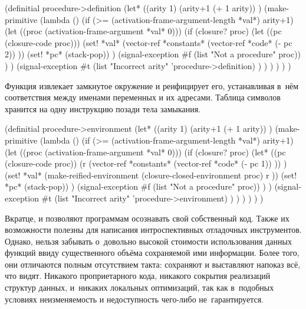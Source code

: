 \begin{code:lisp}
(definitial procedure->definition
  (let* ((arity 1)
         (arity+1 (+ 1 arity)) )
    (make-primitive
     (lambda ()
       (if (>= (activation-frame-argument-length *val*) arity+1)
           (let ((proc (activation-frame-argument *val* 0)))
             (if (closure? proc)
                 (let ((pc (closure-code proc)))
                   (set! *val* (vector-ref *constants*
                                (vector-ref *code* (- pc 2)) ))
                   (set! *pc* (stack-pop)) )
                 (signal-exception #f (list "Not a procedure" proc)) ) )
           (signal-exception #t
            (list "Incorrect arity" 'procedure->definition) ) ) ) ) ) )
\end{code:lisp}

Функция  извлекает замкнутое окружение и реифицирует
его, устанавливая в~нём соответствия между именами переменных и их адресами.
Таблица символов хранится на одну инструкцию позади тела замыкания.

\begin{code:lisp}
(definitial procedure->environment
  (let* ((arity 1)
         (arity+1 (+ 1 arity)) )
    (make-primitive
     (lambda ()
       (if (>= (activation-frame-argument-length *val*) arity+1)
           (let ((proc (activation-frame-argument *val* 0)))
             (if (closure? proc)
                 (let* ((pc (closure-code proc))
                        (r (vector-ref *constants*
                            (vector-ref *code* (- pc 1)) )) )
                   (set! *val* (make-reified-environment
                                (closure-closed-environment proc)
                                r ))
                   (set! *pc* (stack-pop)) )
                 (signal-exception #f (list "Not a procedure" proc)) ) )
           (signal-exception #t
            (list "Incorrect arity" 'procedure->environment) ) ) ) ) ) )
\end{code:lisp}

Вкратце,  и  позволяют
программам осознавать свой собственный код. Также их возможности полезны для
написания интроспективных отладочных инструментов. Однако, нельзя забывать
о~довольно высокой стоимости использования данных функций ввиду существенного
объёма сохраняемой ими информации. Более того, они отличаются полным
отсутствием такта: сохраняют и выставляют напоказ всё, что видят. Никакого
проприетарного кода, никакого сокрытия реализаций структур данных, и~никаких
локальных оптимизаций, так как в~подобных условиях неизменяемость и
недоступность чего-либо не~гарантируется.

